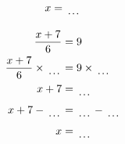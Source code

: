 \documentclass[12pt]{article}
\newcounter{minipagecount}
\begin{document}
\begin{multicols}{2}
\begin{minipage}[t]{0.45\textwidth}
\begin{align*}
        x &= \dotuline{\hspace{5mm}}\\
    \end{align*}
\end{minipage} %
\noindent{(\theminipagecount)}\hspace{0.1mm} %
\begin{minipage}[t]{0.45\textwidth} %
    \vspace{-26pt}  %
    \raggedright %
    \begin{align*} %
        \frac{x + 7}{6} &= 9\\
        \frac{x + 7}{6} \times\dotuline{\hspace{5mm}} &= 9 \times\dotuline{\hspace{5mm}}\\
        x + 7 &= \dotuline{\hspace{5mm}}\\
        x + 7 - \dotuline{\hspace{5mm}} &= \dotuline{\hspace{5mm}} - \dotuline{\hspace{5mm}}\\
        x &= \dotuline{\hspace{5mm}}\\
    \end{align*}
\end{minipage} %
\noindent{(\theminipagecount)}\hspace{0.1mm} %
\begin{minipage}[t]{0.45\textwidth} %
    \vspace{-26pt}  %

\end{minipage}
\end{multicols}
\end{document}
